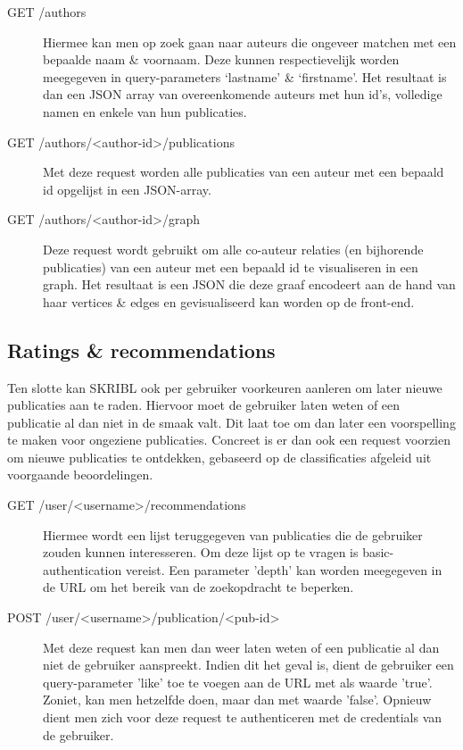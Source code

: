 \documentclass{article}
\begin{document}
\begin{description}

\item[GET /authors] Hiermee kan men op zoek gaan naar auteurs die ongeveer matchen met een bepaalde naam \& voornaam. Deze kunnen respectievelijk worden meegegeven in query-parameters `lastname' \& `firstname'. Het resultaat is dan een JSON array van overeenkomende auteurs met hun id's, volledige namen en enkele van hun publicaties.

\item[GET /authors/<author-id>/publications] Met deze request worden alle publicaties van een auteur met een bepaald id opgelijst in een JSON-array.

\item[GET /authors/<author-id>/graph] Deze request wordt gebruikt om alle co-auteur relaties (en bijhorende publicaties) van een auteur met een bepaald id te visualiseren in een graph. Het resultaat is een JSON die deze graaf encodeert aan de hand van haar vertices \& edges en gevisualiseerd kan worden op de front-end.

\end{description}

\subsection{Ratings \& recommendations}

Ten slotte kan SKRIBL ook per gebruiker voorkeuren aanleren om later nieuwe publicaties aan te raden. Hiervoor moet de gebruiker laten weten of een publicatie al dan niet in de smaak valt. Dit laat toe om dan later een voorspelling te maken voor ongeziene publicaties. Concreet is er dan ook een request voorzien om nieuwe publicaties te ontdekken, gebaseerd op de classificaties afgeleid uit voorgaande beoordelingen.

\begin{description}

\item[GET /user/<username>/recommendations] Hiermee wordt een lijst teruggegeven van publicaties die de gebruiker zouden kunnen interesseren. Om deze lijst op te vragen is basic-authentication vereist. Een parameter 'depth' kan worden meegegeven in de URL om het bereik van de zoekopdracht te beperken.

\item[POST /user/<username>/publication/<pub-id>] Met deze request kan men dan weer laten weten of een publicatie al dan niet de gebruiker aanspreekt. Indien dit het geval is, dient de gebruiker een query-parameter 'like' toe te voegen aan de URL met als waarde 'true'. Zoniet, kan men hetzelfde doen, maar dan met waarde 'false'. Opnieuw dient men zich voor deze request te authenticeren met de credentials van de gebruiker.

\end{description}
\end{document}
